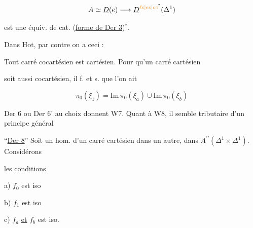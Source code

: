 \[
A\simeq\underline D(e)\longrightarrow\underline D^{\unsure{\ell c|ec|cc}}(\Delta^1)
\]

est une équiv. de cat. (\uline{forme de Der 3})$^*$.


Dans Hot, par contre on a ceci :

Tout carré cocartésien est cartésien. Pour qu'un carré cartésien


soit aussi cocartésien, il f. et s. que l'on ait

\[
\pi_0(\xi_1)=\mathrm{Im}\,\pi_0(\xi_a)\cup\mathrm{Im}\,\pi_0(\xi_b)
\]


Der 6 ou Der 6' au choix donnent W7. Quant à W8, il semble tributaire d'un principe général 

``\uline{Der 8}'' Soit un hom. d'un carré cartésien dans un autre, dans $A^{\prime\prime}(\Delta^1\times\Delta^1)$. Considérons


les conditions

a) $f_0$ est iso

b) $f_1$ est iso

c) $f_a$ \uline{et} $f_b$ est iso.


